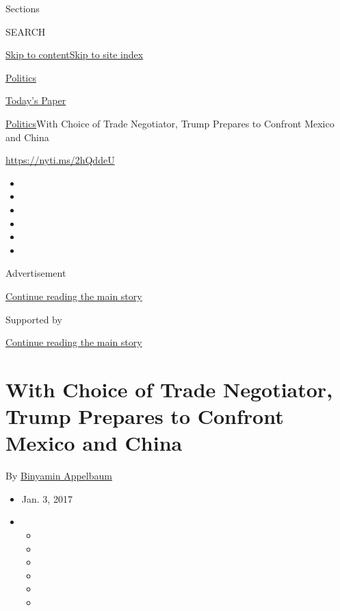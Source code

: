 Sections

SEARCH

\protect\hyperlink{site-content}{Skip to
content}\protect\hyperlink{site-index}{Skip to site index}

\href{https://www.nytimes3xbfgragh.onion/section/politics}{Politics}

\href{https://myaccount.nytimes3xbfgragh.onion/auth/login?response_type=cookie\&client_id=vi}{}

\href{https://www.nytimes3xbfgragh.onion/section/todayspaper}{Today's
Paper}

\href{/section/politics}{Politics}\textbar{}With Choice of Trade
Negotiator, Trump Prepares to Confront Mexico and China

\url{https://nyti.ms/2hQddeU}

\begin{itemize}
\item
\item
\item
\item
\item
\item
\end{itemize}

Advertisement

\protect\hyperlink{after-top}{Continue reading the main story}

Supported by

\protect\hyperlink{after-sponsor}{Continue reading the main story}

\hypertarget{with-choice-of-trade-negotiator-trump-prepares-to-confront-mexico-and-china}{%
\section{With Choice of Trade Negotiator, Trump Prepares to Confront
Mexico and
China}\label{with-choice-of-trade-negotiator-trump-prepares-to-confront-mexico-and-china}}

By
\href{http://www.nytimes3xbfgragh.onion/by/binyamin-appelbaum}{Binyamin
Appelbaum}

\begin{itemize}
\item
  Jan. 3, 2017
\item
  \begin{itemize}
  \item
  \item
  \item
  \item
  \item
  \item
  \end{itemize}
\end{itemize}

